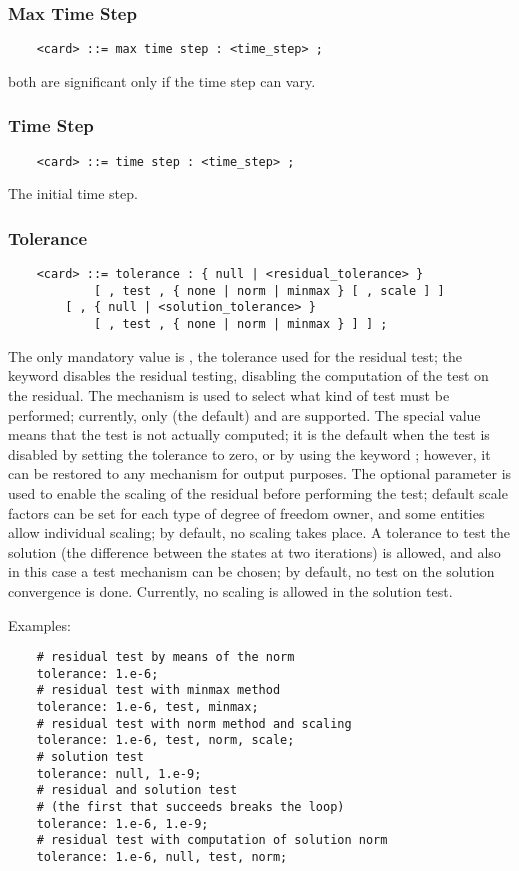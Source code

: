 \subsubsection{Max Time Step}
\begin{verbatim}
    <card> ::= max time step : <time_step> ;
\end{verbatim}
both are significant only if the time step can vary.

\subsubsection{Time Step}
\begin{verbatim}
    <card> ::= time step : <time_step> ;
\end{verbatim}
The initial time step.

\subsubsection{Tolerance}
\begin{verbatim}
    <card> ::= tolerance : { null | <residual_tolerance> }
            [ , test , { none | norm | minmax } [ , scale ] ]
        [ , { null | <solution_tolerance> } 
            [ , test , { none | norm | minmax } ] ] ;
\end{verbatim}
The only mandatory value is , 
the tolerance used for the residual test; the keyword 
disables the residual testing, disabling the computation
of the test on the residual.
The  mechanism is used to select what kind of test must
be performed; currently, only  (the default) 
and  are supported.
The special value  means that the test is not actually 
computed; it is the default when the test is disabled by setting
the tolerance to zero, or by using the keyword ;
however, it can be restored to any mechanism for output purposes.
The optional parameter  is used to enable the scaling
of the residual before performing the test; default scale factors 
can be set for each type of degree of freedom owner, and some
entities allow individual scaling; by default, no scaling takes place.
A tolerance  to test the solution 
(the difference between the states at two iterations) is allowed, 
and also in this case a test mechanism can be chosen;
by default, no test on the solution convergence is done.
Currently, no scaling is allowed in the solution test.

\noindent
Examples:
\begin{verbatim}
    # residual test by means of the norm
    tolerance: 1.e-6;
    # residual test with minmax method
    tolerance: 1.e-6, test, minmax;
    # residual test with norm method and scaling
    tolerance: 1.e-6, test, norm, scale;
    # solution test
    tolerance: null, 1.e-9;
    # residual and solution test
    # (the first that succeeds breaks the loop)
    tolerance: 1.e-6, 1.e-9;
    # residual test with computation of solution norm
    tolerance: 1.e-6, null, test, norm;
\end{verbatim}

